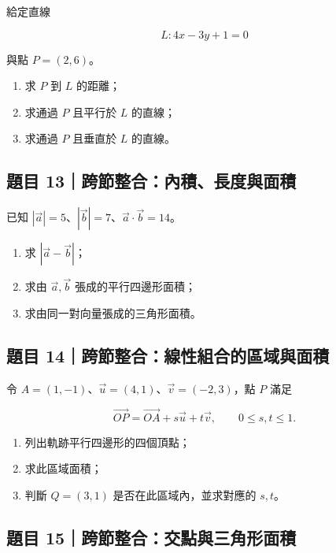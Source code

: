 \documentclass[11pt,a4paper]{article}
\providecommand{\tightlist}{%
  \setlength{\itemsep}{0pt}\setlength{\parskip}{0pt}}
\begin{document}
給定直線

\[
L:4x-3y+1=0
\]

與點 \(P=(2,6)\)。

\begin{enumerate}
\def\labelenumi{\arabic{enumi}.}
\tightlist
\item
  求 \(P\) 到 \(L\) 的距離；
\item
  求通過 \(P\) 且平行於 \(L\) 的直線；
\item
  求通過 \(P\) 且垂直於 \(L\) 的直線。
\end{enumerate}

\subsection{題目 13｜跨節整合：內積、長度與面積}\label{ux984cux76ee-13ux8de8ux7bc0ux6574ux5408ux5167ux7a4dux9577ux5ea6ux8207ux9762ux7a4d}

已知 \(|\vec a|=5\)、\(|\vec b|=7\)、\(\vec a\cdot\vec b=14\)。

\begin{enumerate}
\def\labelenumi{\arabic{enumi}.}
\tightlist
\item
  求 \(|\vec a-\vec b|\)；
\item
  求由 \(\vec a,\vec b\) 張成的平行四邊形面積；
\item
  求由同一對向量張成的三角形面積。
\end{enumerate}

\subsection{題目 14｜跨節整合：線性組合的區域與面積}\label{ux984cux76ee-14ux8de8ux7bc0ux6574ux5408ux7ddaux6027ux7d44ux5408ux7684ux5340ux57dfux8207ux9762ux7a4d}

令 \(A=(1,-1)\)、\(\vec u=(4,1)\)、\(\vec v=(-2,3)\)，點 \(P\) 滿足

\[
\overrightarrow{OP}
=\overrightarrow{OA}+s\vec u+t\vec v,
\qquad 0\le s,t\le1.
\]

\begin{enumerate}
\def\labelenumi{\arabic{enumi}.}
\tightlist
\item
  列出軌跡平行四邊形的四個頂點；
\item
  求此區域面積；
\item
  判斷 \(Q=(3,1)\) 是否在此區域內，並求對應的 \(s,t\)。
\end{enumerate}

\subsection{題目 15｜跨節整合：交點與三角形面積}\label{ux984cux76ee-15ux8de8ux7bc0ux6574ux5408ux4ea4ux9edeux8207ux4e09ux89d2ux5f62ux9762ux7a4d}
\end{document}
